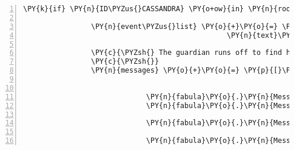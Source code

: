 \begin{Verbatim}[commandchars=\\\{\},numbers=left,firstnumber=1,stepnumber=1]
            \PY{k}{if} \PY{n}{ID\PYZus{}CASSANDRA} \PY{o+ow}{in} \PY{n}{room}\PY{o}{.}\PY{n}{entity\PYZus{}locations}\PY{o}{.}\PY{n}{keys}\PY{p}{(}\PY{p}{)}\PY{p}{:}

                \PY{n}{event\PYZus{}list} \PY{o}{+}\PY{o}{=} \PY{p}{[}\PY{n}{fabula}\PY{o}{.}\PY{n}{SaysEvent}\PY{p}{(}\PY{n}{identifier}\PY{o}{=}\PY{l+s}{\PYZsq{}}\PY{l+s}{guardian}\PY{l+s}{\PYZsq{}}\PY{p}{,}
                                                \PY{n}{text}\PY{o}{=}\PY{l+s}{\PYZsq{}}\PY{l+s}{Oh ihr seid die besten, ich kann endlich wieder muszierend umherziehen!}\PY{l+s}{\PYZsq{}}\PY{p}{)}\PY{p}{]}

                \PY{c}{\PYZsh{} The guardian runs off to find his luck in music making}
                \PY{c}{\PYZsh{}}
                \PY{n}{messages} \PY{o}{+}\PY{o}{=} \PY{p}{[}\PY{n}{fabula}\PY{o}{.}\PY{n}{Message}\PY{p}{(}\PY{p}{[}\PY{n}{fabula}\PY{o}{.}\PY{n}{DropsEvent}\PY{p}{(}\PY{n}{ID\PYZus{}KUNI}\PY{p}{,}
                                                               \PY{n+nb+bp}{self}\PY{o}{.}\PY{n}{host}\PY{o}{.}\PY{n}{rack}\PY{o}{.}\PY{n}{entity\PYZus{}dict}\PY{p}{[}\PY{l+s}{\PYZsq{}}\PY{l+s}{lute}\PY{l+s}{\PYZsq{}}\PY{p}{]}\PY{p}{,}
                                                               \PY{n}{room}\PY{o}{.}\PY{n}{entity\PYZus{}locations}\PY{p}{[}\PY{l+s}{\PYZsq{}}\PY{l+s}{guardian}\PY{l+s}{\PYZsq{}}\PY{p}{]}\PY{p}{)}\PY{p}{]}\PY{p}{)}\PY{p}{,}
                             \PY{n}{fabula}\PY{o}{.}\PY{n}{Message}\PY{p}{(}\PY{p}{[}\PY{n}{fabula}\PY{o}{.}\PY{n}{DeleteEvent}\PY{p}{(}\PY{l+s}{\PYZsq{}}\PY{l+s}{lute}\PY{l+s}{\PYZsq{}}\PY{p}{)}\PY{p}{]}\PY{p}{)}\PY{p}{,}
                             \PY{n}{fabula}\PY{o}{.}\PY{n}{Message}\PY{p}{(}\PY{p}{[}\PY{n}{fabula}\PY{o}{.}\PY{n}{MovesToEvent}\PY{p}{(}\PY{n}{identifier}\PY{o}{=}\PY{l+s}{\PYZsq{}}\PY{l+s}{guardian}\PY{l+s}{\PYZsq{}}\PY{p}{,}
                                                                 \PY{n}{location}\PY{o}{=}\PY{p}{(}\PY{l+m+mi}{2}\PY{p}{,} \PY{l+m+mi}{2}\PY{p}{)}\PY{p}{)}\PY{p}{]}\PY{p}{)}\PY{p}{,}
                             \PY{n}{fabula}\PY{o}{.}\PY{n}{Message}\PY{p}{(}\PY{p}{[}\PY{n}{fabula}\PY{o}{.}\PY{n}{MovesToEvent}\PY{p}{(}\PY{n}{identifier}\PY{o}{=}\PY{l+s}{\PYZsq{}}\PY{l+s}{guardian}\PY{l+s}{\PYZsq{}}\PY{p}{,}
                                                                 \PY{n}{location}\PY{o}{=}\PY{p}{(}\PY{l+m+mi}{1}\PY{p}{,} \PY{l+m+mi}{2}\PY{p}{)}\PY{p}{)}\PY{p}{]}\PY{p}{)}\PY{p}{,}
                             \PY{n}{fabula}\PY{o}{.}\PY{n}{Message}\PY{p}{(}\PY{p}{[}\PY{n}{fabula}\PY{o}{.}\PY{n}{SaysEvent}\PY{p}{(}\PY{n}{identifier}\PY{o}{=}\PY{n}{ID\PYZus{}KUNI}\PY{p}{,}

\end{Verbatim}
